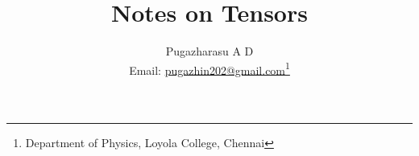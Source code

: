 \documentclass[a4paper,12pt]{book}
\begin{document}
\title{Notes on  Tensors}
\author{Pugazharasu A D \\
	Email: \href{mailto:pugazhin202@gmail.com}{pugazhin202@gmail.com}\footnote{Department of Physics, Loyola College, Chennai}}


\frontmatter
\maketitle 
\nopagebreak
\tableofcontents

\mainmatter



\end{document}
